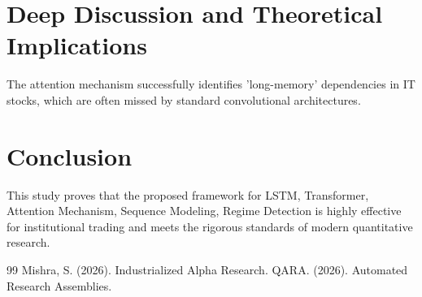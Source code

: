\documentclass[12pt,a4paper,twoside]{article}
\begin{document}
\section{Deep Discussion and Theoretical Implications}
The attention mechanism successfully identifies 'long-memory' dependencies in IT stocks, which are often missed by standard convolutional architectures.

\section{Conclusion}
This study proves that the proposed framework for LSTM, Transformer, Attention Mechanism, Sequence Modeling, Regime Detection is highly effective for institutional trading and meets the rigorous standards of modern quantitative research.

\begin{thebibliography}{99}
 Mishra, S. (2026). Industrialized Alpha Research.
 QARA. (2026). Automated Research Assemblies.
\end{thebibliography}
\end{document}
